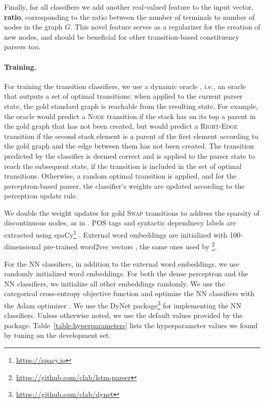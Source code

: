 \documentclass[11pt,a4paper]{article}
\newcommand{\tabref}[1]{Table~\ref{#1}}
\begin{document}
Finally, for all classifiers we add another real-valued feature to the input vector,
\textbf{ratio}, corresponding to the ratio between the number of terminals to number of nodes
in the graph $G$.
This novel feature serves as a regularizer for the creation of new nodes,
and should be beneficial for other transition-based constituency parsers too.

\paragraph{Training.}
For training the transition classifiers, we use a dynamic oracle \cite{goldberg2012dynamic},
i.e., an oracle that outputs a set of optimal transitions: when
applied to the current parser state, the gold
standard graph is reachable from the resulting state.
For example, the oracle would predict a \textsc{Node} transition if the stack 
has on its top a parent in the gold graph that has not been created,
but would predict a \textsc{Right-Edge} transition if the second stack
element is a parent of the
first element according to the gold graph and the edge between them has not been created.
The transition predicted by the classifier is deemed correct
and is applied to the parser state to reach the subsequent state,
if the transition is included in the set of optimal transitions.
Otherwise, a random optimal transition is applied,
and for the perceptron-based parser, the classifier's weights are updated according
to the perceptron update rule.

We double the weight updates
for gold \textsc{Swap} transitions to address the sparsity of discontinuous nodes,
as in \citet{maier2015discontinuous}.
POS tags and syntactic dependnecy labels are extracted using spaCy\footnote{\url{https://spacy.io}}
\cite{honnibal-johnson:2015:EMNLP}.
External word embeddings are initialized with
100-dimensional pre-trained word2vec vectors \cite{mikolov2013efficient},
the same ones used by \citet{dyer2015transition}\footnote{
\url{https://github.com/clab/lstm-parser}}.

For the NN classifiers, in addition to the external word embeddings, we use
randomly initialized word embeddings.
For both the dense perceptron and the NN classifiers,
we initialize all other embeddings randomly.
We use the categorical cross-entropy objective function and optimize the
NN classifiers with the Adam optimizer \cite{kingma2014adam}.
We use the DyNet package\footnote{\url{https://github.com/clab/dynet}}
\cite{neubig2017dynet} for implementing the NN classifiers.
Unless otherwise noted, we use the default values provided by the package.
\tabref{table:hyperparameters} lists the hyperparameter values we found by tuning
on the development set.
\end{document}
